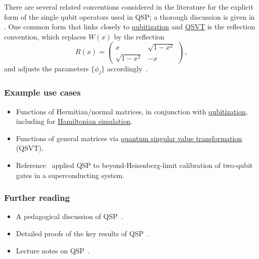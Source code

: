\begin{refsection}
There are several related conventions considered in the literature for the explicit form of the single qubit operators used in QSP; a thorough discussion is given in \cite[Appendix A]{martyn2021GrandUnificationQAlgs}. One common form that links closely to \hyperref[prim:Qubitization]{qubitization} and \hyperref[prim:QSVT]{QSVT} is the reflection convention, which replaces $W(x)$ by the reflection 
\begin{equation}\label{eq:QSPR}
    R(x) = \begin{pmatrix} x &  \sqrt{1-x^2} \\ \sqrt{1-x^2} & -x \end{pmatrix} \,,
\end{equation}
and adjusts the parameters $\{ \phi_j \}$ accordingly~\cite{gilyen2018QSingValTransf}.



\subsubsection*{Example use cases}

\begin{itemize}
    \item Functions of Hermitian/normal matrices, in conjunction with \hyperref[prim:Qubitization]{qubitization}, including for \hyperref[prim:QSPqubitization]{Hamiltonian simulation}.
    \item Functions of general matrices via \hyperref[prim:QSVT]{quantum singular value transformation} (QSVT).
    \item Reference~\cite{dong2022BeyondMetrologyQSP} applied QSP to beyond-Heisenberg-limit calibration of two-qubit gates in a superconducting system.
\end{itemize}


\subsubsection*{Further reading}

\begin{itemize}
    \item A pedagogical discussion of QSP~\cite{martyn2021GrandUnificationQAlgs}.
    \item Detailed proofs of the key results of QSP~\cite{low2016CompositeQuantGates,gilyen2018QSingValTransf}.
    \item Lecture notes on QSP~\cite[Sec. 7.6]{lin2022LectureNotes}.
\end{itemize}

\printbibliography[heading=secbib,segment=\therefsegment]

\end{refsection}


